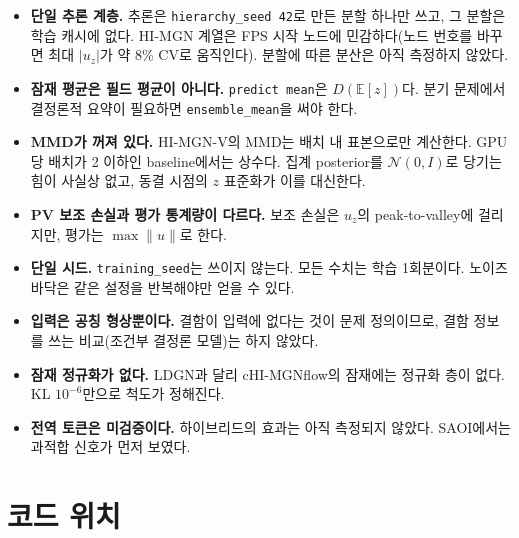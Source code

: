 \documentclass[11pt]{article}
\newcommand{\E}{\mathbb{E}}
\newcommand{\N}{\mathcal{N}}
\newcommand{\code}[1]{\texttt{#1}}
\begin{document}
\begin{itemize}
\item \textbf{단일 추론 계층.} 추론은 \code{hierarchy\_seed 42}로 만든 분할
  하나만 쓰고, 그 분할은 학습 캐시에 없다. HI-MGN 계열은 FPS 시작 노드에
  민감하다(노드 번호를 바꾸면 최대 $|u_z|$가 약 8\% CV로 움직인다). 분할에
  따른 분산은 아직 측정하지 않았다.
\item \textbf{잠재 평균은 필드 평균이 아니다.} \code{predict mean}은
  $D(\E[z])$다. 분기 문제에서 결정론적 요약이 필요하면 \code{ensemble\_mean}을
  써야 한다.
\item \textbf{MMD가 꺼져 있다.} HI-MGN-V의 MMD는 배치 내 표본으로만 계산한다.
  GPU당 배치가 2 이하인 baseline에서는 상수다. 집계 posterior를 $\N(0,I)$로
  당기는 힘이 사실상 없고, 동결 시점의 $z$ 표준화가 이를 대신한다.
\item \textbf{PV 보조 손실과 평가 통계량이 다르다.} 보조 손실은 $u_z$의
  peak-to-valley에 걸리지만, 평가는 $\max\|u\|$로 한다.
\item \textbf{단일 시드.} \code{training\_seed}는 쓰이지 않는다. 모든 수치는
  학습 1회분이다. 노이즈 바닥은 같은 설정을 반복해야만 얻을 수 있다.
\item \textbf{입력은 공칭 형상뿐이다.} 결함이 입력에 없다는 것이 문제
  정의이므로, 결함 정보를 쓰는 비교(조건부 결정론 모델)는 하지 않았다.
\item \textbf{잠재 정규화가 없다.} LDGN과 달리 cHI-MGNflow의 잠재에는 정규화
  층이 없다. KL $10^{-6}$만으로 척도가 정해진다.
\item \textbf{전역 토큰은 미검증이다.} 하이브리드의 효과는 아직 측정되지
  않았다. SAOI에서는 과적합 신호가 먼저 보였다.
\end{itemize}

\section{코드 위치}\label{sec:code}
\end{document}
